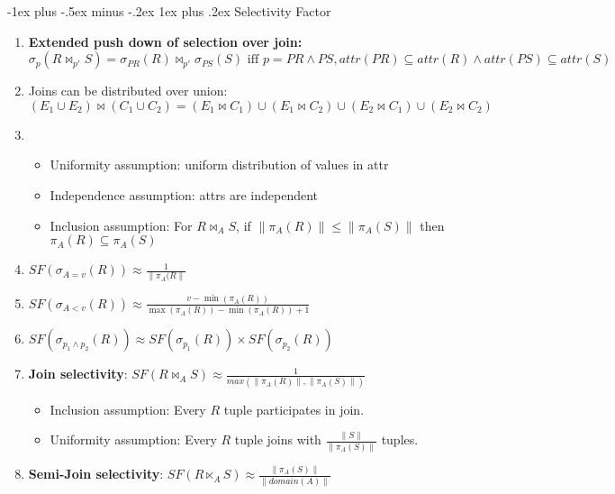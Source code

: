 \documentclass[8pt, landscape]{extarticle}
\makeatletter
\renewcommand{\subsubsection}{\@startsection{subsubsection}{3}{0mm}%
  {-1ex plus -.5ex minus -.2ex}%
  {1ex plus .2ex}%
{\normalfont\small\bfseries}}%
\makeatother
\begin{document}
\begin{multicols*}{4}
  \subsubsection{Selectivity Factor}
  \begin{enumerate}
  \item \textbf{Extended push down of selection over join:} $\sigma_p(R\bowtie_{p'}S)=\sigma_{PR}(R)\bowtie_{p'}\sigma_{PS}(S) \text{ iff } p = PR \land PS, attr(PR) \subseteq attr(R) \land attr(PS) \subseteq attr(S)$
  \item Joins can be distributed over union: $(E_1 \cup E_2)\bowtie (C_1\cup C_2) = (E_1 \bowtie C_1) \cup (E_1 \bowtie C_2) \cup (E_2 \bowtie C_1) \cup (E_2 \bowtie C_2)$
  \item \begin{itemize}
    \item Uniformity assumption: uniform distribution of values in attr
    \item Independence assumption: attrs are independent
    \item Inclusion assumption: For $R \bowtie_A S$, if $\lVert{\pi_A (R)}\lVert \leq \lVert{\pi_A (S)}\lVert$ then $\pi_A (R) \subseteq \pi_A(S)$
  \end{itemize}
  \item $SF(\sigma_{A=v}(R)) \approx \frac{1}{\lVert \pi_A(R \lVert}$
  \item $SF(\sigma_{A<v}(R)) \approx \frac{v-\min(\pi_A(R))}{\max(\pi_A(R)) - \min(\pi_A(R)) + 1}$
  \item $SF(\sigma_{p_1 \land p_2}(R)) \approx SF(\sigma_{p_1}(R)) \times SF(\sigma_{p_2}(R))$
  \item \textbf{Join selectivity}: $SF(R \bowtie_A S) \approx \frac{1}{max(\lVert \pi_A (R) \lVert, \lVert \pi_A (S) \lVert)}$
  \begin{itemize}
    \item Inclusion assumption: Every $R$ tuple participates in join.
    \item Uniformity assumption: Every $R$ tuple joins with $\frac{\lVert S \lVert}{\lVert \pi_A(S) \lVert}$ tuples.
  \end{itemize}
  \item \textbf{Semi-Join selectivity}: $SF(R \ltimes_A S) \approx \frac{\lVert \pi_A(S) \lVert}{\lVert domain(A) \lVert}$
  \end{enumerate}

\end{multicols*}
\end{document}
